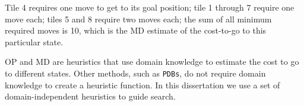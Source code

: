 Tile 4 requires one move to get to its goal position;
tile 1 through 7 require one move each;
tiles 5 and 8 require two moves each;
the sum of all minimum required moves is 10, which is the MD estimate of the cost-to-go to this particular state. 

OP and MD are heuristics that use domain knowledge to estimate the cost to go to different states. Other methods, such as \texttt{PDBs}, do not require domain knowledge to create a heuristic function. In this dissertation we use a set of domain-independent heuristics to guide search. 


%
%


